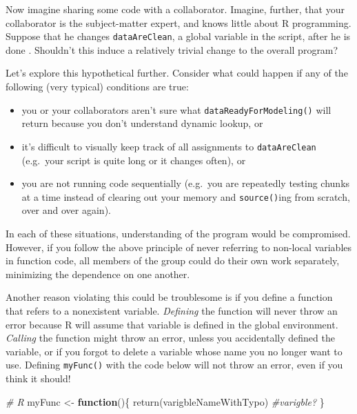 \documentclass[
  12pt,
  krantz2]{krantz}
\makeatletter
\newenvironment{Shaded}{\begin{snugshade}}{\end{snugshade}}
\newcommand{\CommentTok}[1]{\textcolor[rgb]{0.37,0.37,0.37}{\textit{#1}}}
\newcommand{\ControlFlowTok}[1]{\textcolor[rgb]{0.27,0.27,0.27}{\textbf{#1}}}
\newcommand{\FunctionTok}[1]{\textcolor[rgb]{0,0,0}{#1}}
\newcommand{\NormalTok}[1]{#1}
\newcommand{\OtherTok}[1]{\textcolor[rgb]{0.37,0.37,0.37}{#1}}
\providecommand{\tightlist}{%
  \setlength{\itemsep}{0pt}\setlength{\parskip}{0pt}}
\newenvironment{kframe}{%
\medskip{}
\setlength{\fboxsep}{.8em}
 \def\at@end@of@kframe{}%
 \ifinner\ifhmode%
  \def\at@end@of@kframe{\end{minipage}}%
  \begin{minipage}{\columnwidth}%
 \fi\fi%
 \def\FrameCommand##1{\hskip\@totalleftmargin \hskip-\fboxsep
 \colorbox{shadecolor}{##1}\hskip-\fboxsep
     \hskip-\linewidth \hskip-\@totalleftmargin \hskip\columnwidth}%
 \MakeFramed {\advance\hsize-\width
   \@totalleftmargin\z@ \linewidth\hsize
   \@setminipage}}%
 {\par\unskip\endMakeFramed%
 \at@end@of@kframe}
\renewenvironment{Shaded}{\begin{kframe}}{\end{kframe}}
\makeatother
\begin{document}
Now imagine sharing some code with a collaborator. Imagine, further, that your collaborator is the subject-matter expert, and knows little about R programming. Suppose that he changes \texttt{dataAreClean}, a global variable in the script, after he is done . Shouldn't this induce a relatively trivial change to the overall program?

Let's explore this hypothetical further. Consider what could happen if any of the following (very typical) conditions are true:

\begin{itemize}
\tightlist
\item
  you or your collaborators aren't sure what \texttt{dataReadyForModeling()} will return because you don't understand dynamic lookup, or
\item
  it's difficult to visually keep track of all assignments to \texttt{dataAreClean} (e.g.~your script is quite long or it changes often), or
\item
  you are not running code sequentially (e.g.~you are repeatedly testing chunks at a time instead of clearing out your memory and \texttt{source()}ing from scratch, over and over again).
\end{itemize}

In each of these situations, understanding of the program would be compromised. However, if you follow the above principle of never referring to non-local variables in function code, all members of the group could do their own work separately, minimizing the dependence on one another.

Another reason violating this could be troublesome is if you define a function that refers to a nonexistent variable. \emph{Defining} the function will never throw an error because R will assume that variable is defined in the global environment. \emph{Calling} the function might throw an error, unless you accidentally defined the variable, or if you forgot to delete a variable whose name you no longer want to use. Defining \texttt{myFunc()} with the code below will not throw an error, even if you think it should!

\begin{Shaded}
\begin{Highlighting}[]
\CommentTok{\# R}
\NormalTok{myFunc }\OtherTok{\textless{}{-}} \ControlFlowTok{function}\NormalTok{()\{}
  \FunctionTok{return}\NormalTok{(varigbleNameWithTypo) }\CommentTok{\#varigble?}
\NormalTok{\}}
\end{Highlighting}
\end{Shaded}
\end{document}
